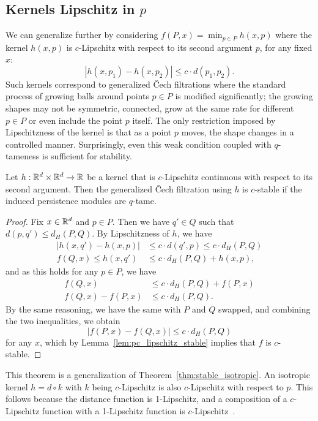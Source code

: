 \subsection{Kernels Lipschitz in $p$}

We can generalize further by considering $f(P, x) = \min_{p \in P} h(x, p)$
where the kernel $h(x, p)$ is $c$-Lipschitz with respect to its second argument
$p$, for any fixed $x$:
\begin{equation}
    |h(x, p_1) - h(x, p_2)| \leq c \cdot d(p_1, p_2).
\end{equation}
Such kernels correspond to generalized \v{C}ech filtrations where the standard
process of growing balls around points $p \in P$ is modified significantly;
the growing shapes may not be symmetric, connected, grow at the same rate for
different $p \in P$ or even include the point $p$ itself. The only restriction
imposed by Lipschitzness of the kernel is that as a point $p$ moves, the shape
changes in a controlled manner. Surprisingly, even this weak condition coupled
with $q$-tameness is sufficient for stability.
\begin{theorem}
    Let $h : \mathbb{R}^d \times \mathbb{R}^d \to \mathbb{R}$ be a kernel that is $c$-Lipschitz
    continuous with respect to its second argument. Then the generalized
    \v{C}ech filtration using $h$ is $c$-stable if the induced persistence
    modules are $q$-tame.
\end{theorem}
\begin{proof}
    Fix $x \in \mathbb{R}^d$ and $p \in P$. Then we have $q' \in Q$ such that $d(p, q')
    \leq d_H(P, Q)$. By Lipschitzness of $h$, we have
    \begin{align}
        |h(x, q') - h(x, p)| & \leq c \cdot d(q', p) \leq c \cdot d_H(P, Q) \\
        f(Q, x) \leq h(x, q') & \leq c \cdot d_H(P, Q) + h(x, p),
    \end{align}
    and as this holds for any $p \in P$, we have
    \begin{align}
        f(Q, x) & \leq c \cdot d_H(P, Q) + f(P, x) \\
        f(Q, x) - f(P, x) & \leq c \cdot d_H(P, Q).
    \end{align}
    By the same reasoning, we have the same with $P$ and $Q$ swapped,
    and combining the two inequalities, we obtain
    \begin{equation}
        |f(P, x) - f(Q, x)| \leq c \cdot d_H(P, Q)
    \end{equation}
    for any $x$, which by Lemma~\ref{lem:pc_lipschitz_stable} implies that
    $f$ is $c$-stable.
\end{proof}
This theorem is a generalization of Theorem~\ref{thm:stable_isotropic}.
An isotropic kernel $h = d \circ k$ with $k$ being $c$-Lipschitz is also
$c$-Lipschitz with respect to $p$. This follows because the distance function
is 1-Lipschitz, and a composition of a $c$-Lipschitz function with a 1-Lipschitz
function is $c$-Lipschitz~\cite{weaver2018lipschitz}.

